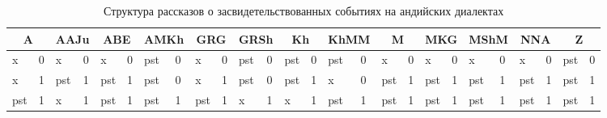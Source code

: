 \begin{table}[H]
\tiny
\caption{Структура рассказов о засвидетельствованных событиях на андийских диалектах}
\label{tab:andinardirect}
\vspace{0.2cm}
\begin{center}
\begin{tabular}{llllllllllllllllllllllllll}
\multicolumn{2}{c}{A}         & \multicolumn{2}{c}{AAJu}                                & \multicolumn{2}{c}{ABE}                                 & \multicolumn{2}{c}{AMKh}                                & \multicolumn{2}{c}{GRG}                                 & \multicolumn{2}{c}{GRSh}                                & \multicolumn{2}{c}{Kh}                                  & \multicolumn{2}{c}{KhMM}                                & \multicolumn{2}{c}{M} & \multicolumn{2}{c}{MKG} & \multicolumn{2}{c}{MShM} & \multicolumn{2}{c}{NNA} & \multicolumn{2}{c}{Z}                                   \\ \hline
\rowcolor[HTML]{C0C0C0} 
x                         & 0 & x                           & 0                         & x                           & 0                         & \cellcolor[HTML]{9AFF99}pst & 0                         & x                           & 0                         & \cellcolor[HTML]{9AFF99}pst & 0                         & \cellcolor[HTML]{9AFF99}pst & 0                         & \cellcolor[HTML]{9AFF99}pst & 0                         & x          & 0        & x           & 0         & x            & 0         & x           & 0         & \cellcolor[HTML]{9AFF99}pst & 0                         \\
\rowcolor[HTML]{9AFF99} 
\cellcolor[HTML]{C0C0C0}x & 1 & pst                         & 1                         & pst                         & 1                         & pst                         & \cellcolor[HTML]{C0C0C0}0 & \cellcolor[HTML]{C0C0C0}x   & 1                         & pst                         & \cellcolor[HTML]{C0C0C0}0 & pst                         & 1                         & \cellcolor[HTML]{C0C0C0}x   & \cellcolor[HTML]{C0C0C0}0 & pst        & 1        & pst         & 1         & pst          & 1         & pst         & 1         & pst                         & 1                         \\
\rowcolor[HTML]{9AFF99} 
pst                       & 1 & \cellcolor[HTML]{C0C0C0}x   & 1                         & pst                         & 1                         & pst                         & 1                         & pst                         & 1                         & \cellcolor[HTML]{C0C0C0}x   & 1                         & \cellcolor[HTML]{C0C0C0}x   & 1                         & pst                         & 1                         & pst        & 1        & pst         & 1         & pst          & 1         & pst         & 1         & pst                         & 1                         \\

\end{tabular}
\end{center}
\end{table}
